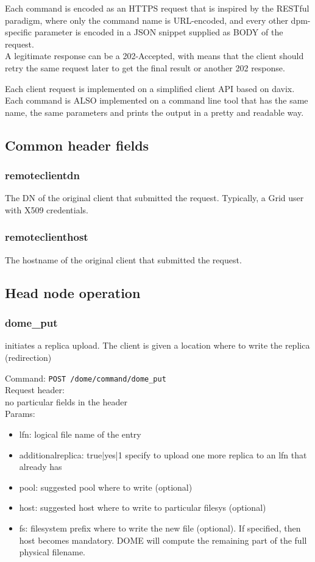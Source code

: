 \documentclass[a4paper,10pt]{scrreprt}
\begin{document}
Each command is encoded as an HTTPS request that is inspired by the RESTful paradigm, where only the command name is URL-encoded, and every other dpm-specific parameter is encoded in a JSON snippet supplied as BODY of the request.\\

A legitimate response can be a 202-Accepted, with means that the client should retry the same request later to get the final result or another 202 response.

Each client request is implemented on a simplified client API based on davix.
Each command is ALSO implemented on a command line tool that has the same name, the same parameters and prints the output in a pretty and readable way.\\

\subsection{Common header fields}


\subsubsection{remoteclientdn}
The DN of the original client that submitted the request. Typically, a Grid user with X509 credentials.\\

\subsubsection{remoteclienthost}
The hostname of the original client that submitted the request.


\subsection{Head node operation}

\subsubsection{dome\_put}
initiates a replica upload. The client is given a location where to write the replica (redirection)

Command:
\lstinline"POST /dome/command/dome_put"\\
Request header:\\
 no particular fields in the header\\
Params:
\begin{itemize}
 \item lfn: logical file name of the entry
 \item additionalreplica: true|yes|1   specify to upload one more replica to an lfn that already has
 \item pool: suggested pool where to write (optional)
 \item host: suggested host where to write to particular filesys (optional)
 \item fs: filesystem prefix where to write the new file (optional). If specified, then host becomes mandatory. DOME will compute the remaining part of the full physical filename.
\end{itemize}
\end{document}
